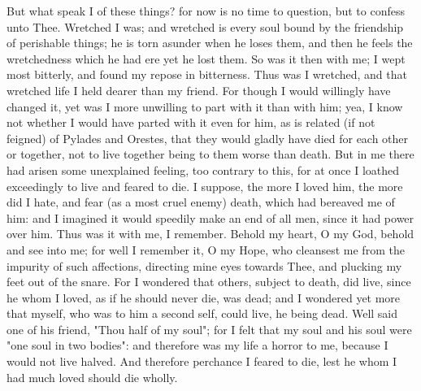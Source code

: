 \documentclass[b5paper,openright,12pt,twoside]{book}
\begin{document}
But what speak I of these things? for now is no time to question, but to
confess unto Thee. Wretched I was; and wretched is every soul bound by
the friendship of perishable things; he is torn asunder when he loses
them, and then he feels the wretchedness which he had ere yet he lost
them. So was it then with me; I wept most bitterly, and found my repose
in bitterness. Thus was I wretched, and that wretched life I held dearer
than my friend. For though I would willingly have changed it, yet was I
more unwilling to part with it than with him; yea, I know not whether I
would have parted with it even for him, as is related (if not feigned)
of Pylades and Orestes, that they would gladly have died for each other
or together, not to live together being to them worse than death. But in
me there had arisen some unexplained feeling, too contrary to this, for
at once I loathed exceedingly to live and feared to die. I suppose, the
more I loved him, the more did I hate, and fear (as a most cruel enemy)
death, which had bereaved me of him: and I imagined it would speedily
make an end of all men, since it had power over him. Thus was it with
me, I remember. Behold my heart, O my God, behold and see into me; for
well I remember it, O my Hope, who cleansest me from the impurity of
such affections, directing mine eyes towards Thee, and plucking my feet
out of the snare. For I wondered that others, subject to death, did
live, since he whom I loved, as if he should never die, was dead; and I
wondered yet more that myself, who was to him a second self, could live,
he being dead. Well said one of his friend, "Thou half of my soul";
for I felt that my soul and his soul were "one soul in two bodies": and
therefore was my life a horror to me, because I would not live halved.
And therefore perchance I feared to die, lest he whom I had much loved
should die wholly.
\end{document}
